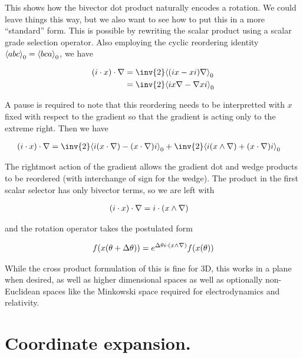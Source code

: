 This shows how the bivector dot product naturally encodes a rotation.  We could leave things this way, but we also want to see how to put this in a more ``standard'' form.  This is possible by rewriting the scalar product using a scalar grade selection operator.  Also employing the cyclic reordering identity ${\left\langle{{ a b c }}\right\rangle}_{0} = {\left\langle{{ b c a}}\right\rangle}_{0}$, we have

\begin{align*}
( i \cdot x) \cdot \grad
&=
\inv{2} \gpgradezero{ ( i x - x i) \grad } \\
&=
\inv{2} \gpgradezero{ i x \grad - \grad x i } \\
\end{align*}

A pause is required to note that this reordering needs to be interpretted with $x$ fixed with respect to the gradient so that the gradient is acting only to the extreme right.  Then we have

\begin{align}\label{eqn:rotationGen:foo17}
( i \cdot x) \cdot \grad
&=
\inv{2} \gpgradezero{ i (x \cdot \grad) - (x \cdot \grad) i } + \inv{2} \gpgradezero{ i (x \wedge \grad) + (x \cdot \grad) i } 
\end{align}

The rightmost action of the gradient allows the gradient dot and wedge products to be reordered (with interchange of sign for the wedge).  The product in the first scalar selector has only bivector terms, so we are left with

\begin{align}\label{eqn:rotationGen:foo18}
( i \cdot x) \cdot \nabla
&=
i \cdot (x \wedge \nabla)
\end{align}

and the rotation operator takes the postulated form

\begin{align}\label{eqn:rotationGen:foo19}
f(x(\theta + \Delta\theta)) = e^{\Delta\theta i \cdot (x \wedge \nabla)} f(x(\theta))
\end{align}

While the cross product formulation of this is fine for 3D, this works in a plane when desired, as well as higher dimensional spaces as well as optionally non-Euclidean spaces like the Minkowski space required for electrodynamics and relativity.

\section{Coordinate expansion.}

